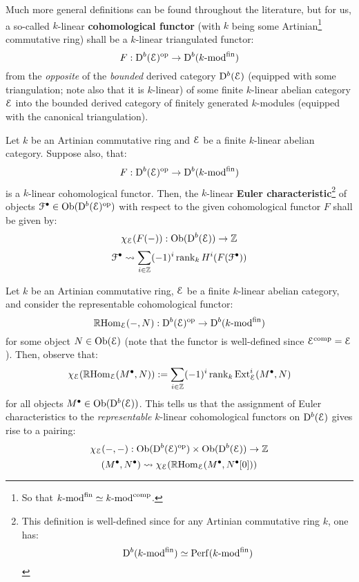             \begin{convention} \label{conv: cohomological_functors_dynkin_quiver_representations}
                Much more general definitions can be found throughout the literature, but for us, a so-called $k$-linear \textbf{cohomological functor} (with $k$ being some Artinian\footnote{So that $k\text{-}\mathrm{mod}^{\mathrm{fin}} \simeq k\text{-}\mathrm{mod}^{\mathrm{comp}}$.} commutative ring) shall be a $k$-linear triangulated functor:
                    $$F: \mathrm{D}^b(\mathcal{E})^{\mathrm{op}} \to \mathrm{D}^b(k\text{-}\mathrm{mod}^{\mathrm{fin}})$$
                from the \textit{opposite} of the \textit{bounded} derived category $\mathrm{D}^b(\mathcal{E})$ (equipped with some triangulation; note also that it is $k$-linear) of some finite $k$-linear abelian category $\mathcal{E}$ into the bounded derived category of finitely generated $k$-modules (equipped with the canonical triangulation).
            \end{convention}
            \begin{definition} \label{def: euler_characteristics}
                Let $k$ be an Artinian commutative ring and $\mathcal{E}$ be a finite $k$-linear abelian category. Suppose also, that:
                    $$F: \mathrm{D}^b(\mathcal{E})^{\mathrm{op}} \to \mathrm{D}^b(k\text{-}\mathrm{mod}^{\mathrm{fin}})$$
                is a $k$-linear cohomological functor. Then, the $k$-linear \textbf{Euler characteristic}\footnote{This definition is well-defined since for any Artinian commutative ring $k$, one has:
                    $$\mathrm{D}^b(k\text{-}\mathrm{mod}^{\mathrm{fin}}) \simeq \mathrm{Perf}(k\text{-}\mathrm{mod}^{\mathrm{fin}})$$} of objects $\mathcal{F}^{\bullet} \in \mathrm{Ob}(\mathrm{D}^b(\mathcal{E})^{\mathrm{op}})$ with respect to the given cohomological functor $F$ shall be given by:
                    $$\chi_{\mathcal{E}}(F(-)): \mathrm{Ob}(\mathrm{D}^b(\mathcal{E})) \to \mathbb{Z}$$
                    $$\mathcal{F}^{\bullet} \leadsto \sum_{i \in \mathbb{Z}} (-1)^i \operatorname{rank}_k H^i(F(\mathcal{F}^{\bullet}))$$
            \end{definition}
            \begin{remark} \label{remark: euler_characteristics_as_bilinear_forms}
                Let $k$ be an Artinian commutative ring, $\mathcal{E}$ be a finite $k$-linear abelian category, and consider the representable cohomological functor:
                    $$\mathbb{R}\mathrm{Hom}_{\mathcal{E}}(-, N): \mathrm{D}^b(\mathcal{E})^{\mathrm{op}} \to \mathrm{D}^b(k\text{-}\mathrm{mod}^{\mathrm{fin}})$$
                for some object $N \in \mathrm{Ob}(\mathcal{E})$ (note that the functor is well-defined since $\mathcal{E}^{\mathrm{comp}} = \mathcal{E}$). Then, observe that:
                    $$\chi_{\mathcal{E}}(\mathbb{R}\mathrm{Hom}_{\mathcal{E}}(M^{\bullet}, N)) := \sum_{i \in \mathbb{Z}} (-1)^i \operatorname{rank}_k \mathrm{Ext}^i_{\mathcal{E}}(M^{\bullet}, N)$$
                for all objects $M^{\bullet} \in \mathrm{Ob}(\mathrm{D}^b(\mathcal{E}))$. This tells us that the assignment of Euler characteristics to the \textit{representable} $k$-linear cohomological functors on $\mathrm{D}^b(\mathcal{E})$ gives rise to a pairing:
                    $$\chi_{\E}(-, -): \Ob(\rmD^b(\E)^{\op}) \x \Ob(\rmD^b(\E)) \to \Z$$
                    $$(M^{\bullet}, N^{\bullet}) \leadsto \chi_{\mathcal{E}}(\mathbb{R}\mathrm{Hom}_{\mathcal{E}}(M^{\bullet}, N^{\bullet}[0]))$$
            \end{remark}
